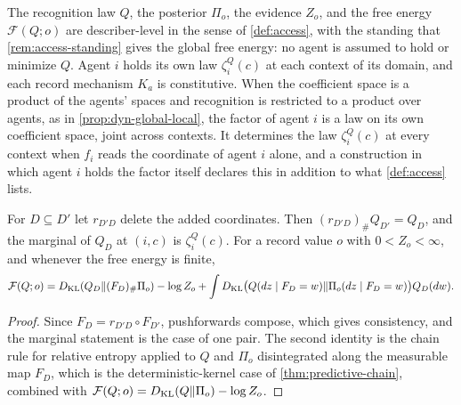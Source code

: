 The recognition law $Q$, the posterior $\Pi_o$, the evidence $Z_o$, and the free energy $\mathcal F(Q;o)$ are describer-level in the sense of \cref{def:access}, with the standing that \cref{rem:access-standing} gives the global free energy: no agent is assumed to hold or minimize $Q$. Agent $i$ holds its own law $\zeta_i^Q(c)$ at each context of its domain, and each record mechanism $K_a$ is constitutive. When the coefficient space is a product of the agents' spaces and recognition is restricted to a product over agents, as in \cref{prop:dyn-global-local}, the factor of agent $i$ is a law on its own coefficient space, joint across contexts. It determines the law $\zeta_i^Q(c)$ at every context when $f_i$ reads the coordinate of agent $i$ alone, and a construction in which agent $i$ holds the factor itself declares this in addition to what \cref{def:access} lists.

For $D\subseteq D'$ let $r_{D'D}$ delete the added coordinates. Then $(r_{D'D})_\#Q_{D'}=Q_D$, and the marginal of $Q_D$ at $(i,c)$ is $\zeta_i^Q(c)$. For a record value $o$ with $0<Z_o<\infty$, and whenever the free energy is finite,
\begin{equation}
 \mathcal F(Q;o)
 =D_{\mathrm{KL}}(Q_D\Vert(F_D)_\#\Pi_o)-\log Z_o
 +\int D_{\mathrm{KL}}\bigl(Q(dz\mid F_D=w)\Vert\Pi_o(dz\mid F_D=w)\bigr)Q_D(dw).
 \label{eq:content-projected}
\end{equation}
\begin{proof}
Since $F_D=r_{D'D}\circ F_{D'}$, pushforwards compose, which gives consistency, and the marginal statement is the case of one pair. The second identity is the chain rule for relative entropy applied to $Q$ and $\Pi_o$ disintegrated along the measurable map $F_D$, which is the deterministic-kernel case of \cref{thm:predictive-chain}, combined with $\mathcal F(Q;o)=D_{\mathrm{KL}}(Q\Vert\Pi_o)-\log Z_o$.
\end{proof}

